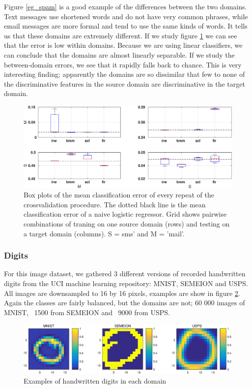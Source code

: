 \documentclass[twoside,11pt]{article}
\begin{document}
Figure \ref{eg_spam} is a good example of the differences between the two domains. Text messages use shortened words and do not have very common phrases, while email messages are more formal and tend to use the same kinds of words. It tells us that these domains are extremely different. If we study figure \ref{err_spam} we can see that the error is low within domains. Because we are using linear classifiers, we can conclude that the domains are almost linearly separable. If we study the between-domain errors, we see that it rapidly falls back to chance. This is very interesting finding; apparently the domains are so dissimilar that few to none of the discriminative features in the source domain are discriminative in the target domain. 

\begin{figure}[ht]
	\centering
	\includegraphics[width=.9\textwidth]{images/err_spam_box.eps}
	\caption{Box plots of the mean classification error of every repeat of the crossvalidation procedure. The dotted black line is the mean classification error of a naive logistic regressor. Grid shows pairwise combinations of traning on one source domain (rows) and testing on a target domain (columns). S = sms' and M = 'mail'.}
	\label{err_spam}
\end{figure}

\subsubsection{Digits}
For this image dataset, we gathered 3 different versions of recorded handwritten digits from the UCI machine learning repository: MNIST, SEMEION and USPS. All images are downsampled to 16 by 16 pixels, examples are show in figure \ref{eg_digits}. Again the classes are fairly balanced, but the domains are not; 60 000 images of MNIST, ~1500 from SEMEION and ~9000 from USPS. 

\begin{figure}[ht]
	\centering
	\includegraphics[width=.9\textwidth]{images/digits_examples.eps}
	\caption{Examples of handwritten digits in each domain}
	\label{eg_digits}
\end{figure}
\end{document}

